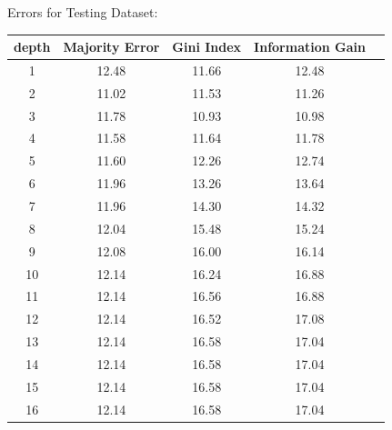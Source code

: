 \documentclass[12pt, fullpage,letterpaper]{article}
\begin{document}
\begin{enumerate}
\begin{enumerate}
Errors for Testing Dataset:
 \begin{table}[h]
	\centering
	\begin{tabular}{cccc|c}
		depth & Majority Error & Gini Index & Information Gain\\ 
		\hline\hline
		1 & 12.48 & 11.66 & 12.48  \\ \hline
		2 & 11.02 & 11.53 & 11.26 \\ \hline
		3 & 11.78 & 10.93 & 10.98 \\ \hline
		4 & 11.58 & 11.64 & 11.78 \\ \hline
		5 & 11.60 & 12.26 & 12.74\\ \hline
		6 & 11.96 & 13.26 & 13.64\\ \hline
		7 & 11.96 & 14.30 & 14.32 \\ \hline
		8 & 12.04 & 15.48 & 15.24 \\ \hline
		9 & 12.08 & 16.00 & 16.14 \\ \hline
		10 & 12.14 & 16.24 & 16.88 \\ \hline
		11 & 12.14 & 16.56 & 16.88\\ \hline
		12 & 12.14 & 16.52 & 17.08\\ \hline
		13 & 12.14 & 16.58 & 17.04\\ \hline
		14 & 12.14 & 16.58 & 17.04\\ \hline
		15 & 12.14 & 16.58 & 17.04\\ \hline
		16 & 12.14 & 16.58 & 17.04\\ \hline
	\end{tabular}
\end{table}
	

\end{enumerate}
\end{enumerate}
\end{document}
